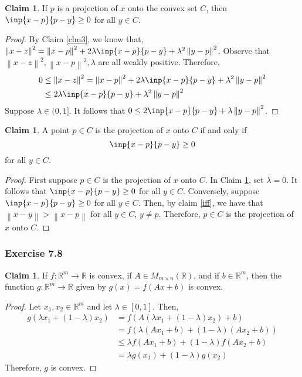 \documentclass[letterpaper,12pt]{article}
\theoremstyle{definition}
\newtheorem{claim}[theorem]{Claim}
\newcommand{\norm}[1]{\left\lVert#1\right\rVert}
\begin{document}
\begin{claim} \label{if}
	If $p$ is a projection of $x$ onto the convex set $C$, then $\inp{x-p}{p-y} \geq 0$ for all $y \in C$. 
\end{claim}
\begin{proof}
	By Claim \ref{clm3}, we know that, $\norm{x-z}^2 = \norm{x-p}^2 + 2\lambda\inp{x-p}{p-y} + \lambda^2 \norm{y-p}^2$. Observe that $\norm{x-z}^2, \norm{x-p}^2, \lambda$ are all weakly positive. Therefore, 
	\begin{align*}
	0 &\leq \norm{x-z}^2 = \norm{x-p}^2 + 2\lambda\inp{x-p}{p-y} + \lambda^2 \norm{y-p}^2\\
	&\leq 2\lambda\inp{x-p}{p-y} + \lambda^2 \norm{y-p}^2
	\end{align*}
	Suppose $\lambda \in (0,1]$. It follows that $0 \leq 2\inp{x-p}{p-y} + \lambda \norm{y-p}^2$.
\end{proof}

\begin{claim}
	A point $p \in C$ is the projection of $x$ onto $C$ if and only if
	\begin{equation}
	\inp{x-p}{p-y} \geq 0 
	\end{equation}
	for all $y \in C$. 
\end{claim}
\begin{proof}
	First suppose $p \in C$ is the projection of $x$ onto $C$. In Claim \ref{if}, set $\lambda = 0$. It follows that $\inp{x-p}{p-y} \geq 0$ for all $y \in C$. Conversely, suppose $\inp{x-p}{p-y} \geq 0 $ for all $y \in C$. Then, by claim \ref{iff}, we have that $\norm{x - y} > \norm{x-p}$ for all $y \in C$, $y \neq p$. Therefore, $p \in C$ is the projection of $x$ onto $C$.
\end{proof}

\subsubsection*{Exercise 7.8}
\begin{claim}
	If $f: \mathbb{R}^m \to \mathbb{R}$ is convex, if $A \in M_{m \times n} (\mathbb{R})$, and if $b \in \mathbb{R}^m$, then the function $g: \mathbb{R}^m \to \mathbb{R}$ given by $g(x) = f(Ax + b)$ is convex.
\end{claim}
\begin{proof}
	Let $x_1, x_2 \in \mathbb{R}^m$ and let $\lambda \in [0,1]$. Then,
	\begin{align*}
	g(\lambda x_1 + (1 - \lambda)x_2) &= f(A (\lambda x_1 + (1 - \lambda)x_2) + b) \\
	&= f(\lambda(A x_1 + b) + (1-\lambda)(A x_2 + b)) \\
	&\leq \lambda f(A x_1 + b) + (1-\lambda) f(A x_2 + b) \tag{by the convexity of $f$}\\ 
	&= \lambda g(x_1) + (1 - \lambda) g(x_2) 
	\end{align*}
	Therefore, $g$ is convex.
\end{proof}
\end{document}
